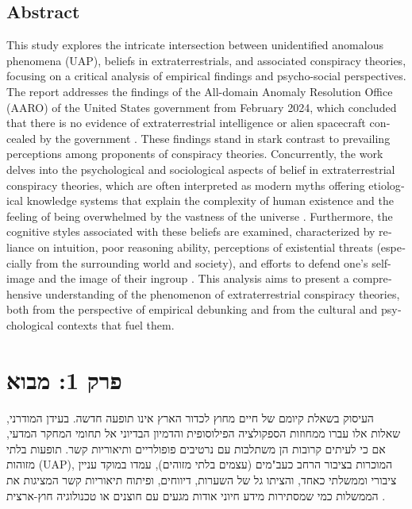 \documentclass[12pt,a4paper]{article}
\begin{document}
\subsection*{Abstract}
\begin{otherlanguage}{english}
This study explores the intricate intersection between unidentified anomalous phenomena (UAP), beliefs in extraterrestrials, and associated conspiracy theories, focusing on a critical analysis of empirical findings and psycho-social perspectives. The report addresses the findings of the All-domain Anomaly Resolution Office (AARO) of the United States government from February 2024, which concluded that there is no evidence of extraterrestrial intelligence or alien spacecraft concealed by the government \cite{1, 2, 6}. These findings stand in stark contrast to prevailing perceptions among proponents of conspiracy theories. Concurrently, the work delves into the psychological and sociological aspects of belief in extraterrestrial conspiracy theories, which are often interpreted as modern myths offering etiological knowledge systems that explain the complexity of human existence and the feeling of being overwhelmed by the vastness of the universe \cite{3}. Furthermore, the cognitive styles associated with these beliefs are examined, characterized by reliance on intuition, poor reasoning ability, perceptions of existential threats (especially from the surrounding world and society), and efforts to defend one's self-image and the image of their ingroup \cite{4}. This analysis aims to present a comprehensive understanding of the phenomenon of extraterrestrial conspiracy theories, both from the perspective of empirical debunking and from the cultural and psychological contexts that fuel them.
\end{otherlanguage}

\tableofcontents

\section{פרק 1: מבוא}

העיסוק בשאלת קיומם של חיים מחוץ לכדור הארץ אינו תופעה חדשה. בעידן המודרני, שאלות אלו עברו ממחוזות הספקולציה הפילוסופית והדמיון הבדיוני אל תחומי המחקר המדעי, אם כי לעיתים קרובות הן משתלבות עם נרטיבים פופולריים ותיאוריות קשר. תופעות בלתי מזוהות (UAP), המוכרות בציבור הרחב כעב"מים (עצמים בלתי מזוהים), עמדו במוקד עניין ציבורי וממשלתי כאחד, והציתו גל של השערות, דיווחים, ופיתוח תיאוריות קשר המציגות את הממשלות כמי שמסתירות מידע חיוני אודות מגעים עם חוצנים או טכנולוגיה חוץ-ארצית \cite{1, 2, 6}.
\end{document}
